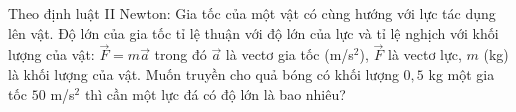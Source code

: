 \caukq
\begin{ex}%
	Theo định luật II Newton: Gia tốc của một vật có cùng hướng với lực tác dụng lên vật. Độ lớn của gia tốc tỉ lệ thuận với độ lớn của lực và tỉ lệ nghịch với khối lượng của vật:
	$\overrightarrow{F}=m\overrightarrow{a}$ trong đó $\overrightarrow{a}$ là vectơ gia tốc (m/s$^2$), $\overrightarrow{F}$ là vectơ lực, $m$ (kg) là khối lượng của vật. Muốn truyền cho quả bóng có khối lượng $0{,}5$ kg một gia tốc $50$ m/s$^2$ thì cần một lực đá có độ lớn là bao nhiêu?
\end{ex}

